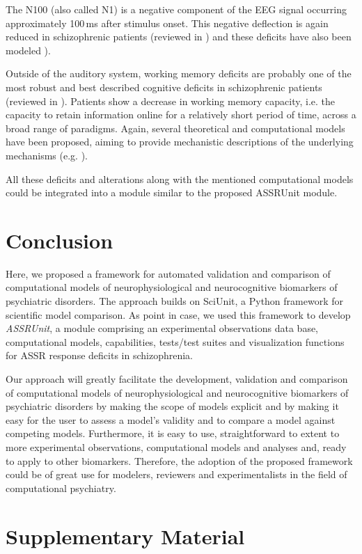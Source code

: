 \documentclass[a4paper,10pt]{article}
\begin{document}
The N100 (also called N1) is a negative component of the EEG signal occurring approximately 100\,ms after stimulus onset. This negative deflection is again reduced in schizophrenic patients 
(reviewed in \cite{Rosburg2008,Rissling2010,Javitt2008}) and these deficits have also been modeled \cite{Ventouras2000}).

Outside of the auditory system, working memory deficits are probably one of the most robust and best described cognitive deficits in schizophrenic patients (reviewed in \cite{Piskulic2007,Lee2005}). Patients
show a decrease in working memory capacity, i.e. the capacity to retain information online for a relatively short period of time, across a broad range of paradigms.
Again, several theoretical and computational models have been proposed, aiming to provide mechanistic descriptions of the underlying mechanisms (e.g. \cite{Compte2000,Durstewitz2000,Wang2004,Singh2006,Wang2001,Cano2012}). 

All these deficits and alterations along with the mentioned computational models could be integrated into a module similar to the proposed ASSRUnit module.

\section{Conclusion}
Here, we proposed a framework for automated validation and comparison of computational models of neurophysiological and 
neurocognitive biomarkers of psychiatric disorders. The approach builds on
SciUnit, a Python framework for scientific model comparison. As point in case, we used this framework to develop \textit{ASSRUnit}, a module comprising 
an experimental observations data base, computational models, capabilities, tests/test suites and visualization functions for
ASSR response deficits in schizophrenia. 

Our approach will greatly facilitate the development, validation and comparison of computational models of neurophysiological 
and neurocognitive biomarkers of psychiatric disorders by making the scope of models explicit and by 
making it easy for the user to assess a model's validity and to compare a model against competing models. Furthermore, it is easy to use, 
straightforward to extent to more experimental observations, computational models and analyses and,
ready to apply to other biomarkers. Therefore, the adoption of the proposed framework could be of great use for modelers, reviewers and 
experimentalists in the field of computational psychiatry.


 


\section*{Supplementary Material}





\end{document}
